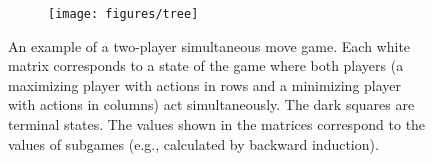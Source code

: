 
\begin{figure}[t!]
\centering
\begin{subfigure}{12cm}
\centering
\texttt{[image: figures/tree]}\\
\end{subfigure}%
\caption{An example of a two-player simultaneous move game. %
Each white matrix corresponds to a state of the game where both players (a maximizing player with actions in rows and a minimizing player with actions in columns) act simultaneously.
The dark squares are terminal states. 
The values shown in the matrices correspond to the values of subgames (e.g., calculated by backward induction).\\
\label{fig:example}}
\end{figure}

